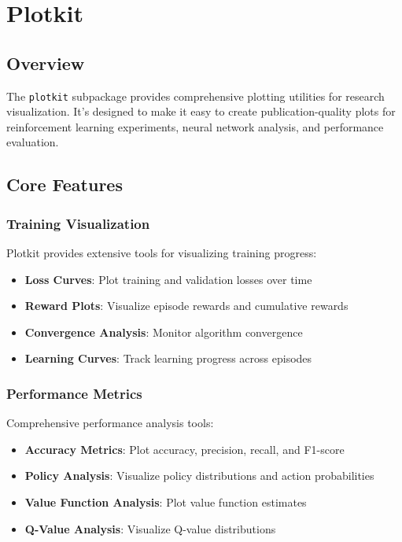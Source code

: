 \chapter{Plotkit}

\section{Overview}

The \texttt{plotkit} subpackage provides comprehensive plotting utilities for research visualization. It's designed to make it easy to create publication-quality plots for reinforcement learning experiments, neural network analysis, and performance evaluation.

\section{Core Features}

\subsection{Training Visualization}

Plotkit provides extensive tools for visualizing training progress:

\begin{itemize}
    \item \textbf{Loss Curves}: Plot training and validation losses over time
    \item \textbf{Reward Plots}: Visualize episode rewards and cumulative rewards
    \item \textbf{Convergence Analysis}: Monitor algorithm convergence
    \item \textbf{Learning Curves}: Track learning progress across episodes
\end{itemize}

\subsection{Performance Metrics}

Comprehensive performance analysis tools:

\begin{itemize}
    \item \textbf{Accuracy Metrics}: Plot accuracy, precision, recall, and F1-score
    \item \textbf{Policy Analysis}: Visualize policy distributions and action probabilities
    \item \textbf{Value Function Analysis}: Plot value function estimates
    \item \textbf{Q-Value Analysis}: Visualize Q-value distributions
\end{itemize}


